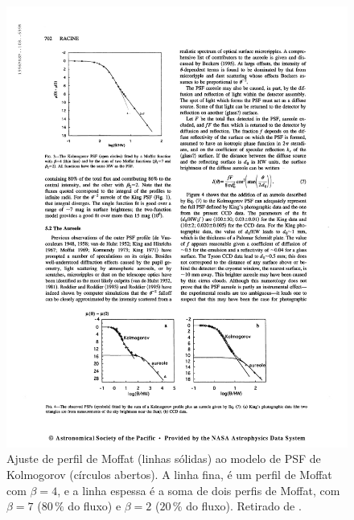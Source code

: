 \begin{figure}
	\includegraphics{figuras/PSFRacine}
	\caption[Ajuste de perfil de Moffat ao modelo de PSF de Kolmogorov.]
	{Ajuste de perfil de Moffat (linhas sólidas) ao modelo de PSF de Kolmogorov
	(círculos abertos). A linha fina, é um perfil de Moffat com $\beta\!=\!4$, e a
	linha espessa é a soma de dois perfis de Moffat, com $\beta\!=\!7$ ($80\,\%$
	do fluxo) e $\beta\!=\!2$ ($20\,\%$ do fluxo). Retirado de \citet{Racine1996}.}
	\label{fig:PSFRacine}
\end{figure}

